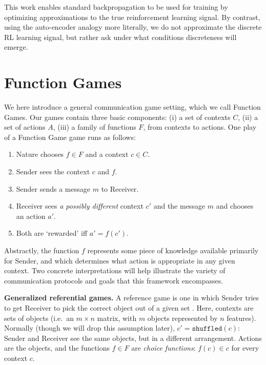 \documentclass[11pt,a4paper]{article}
\newcommand{\nbSST}[1]{{\leavevmode\color{violet}{\scriptsize#1}}}
\begin{document}
This work enables standard backpropagation to be used for training by optimizing approximations to the true reinforcement learning signal.  By contrast, using the auto-encoder analogy more literally, we do not approximate the discrete RL learning signal, but rather ask under what conditions discreteness will emerge. 

\section{Function Games}

We here introduce a general communication game setting, which we call Function Games.  Our games contain three basic components: (i) a set of contexts $C$, (ii) a set of actions $A$, (iii) a family of functions $F$, from contexts to actions.  One play of a Function Game game runs as follows:
\begin{enumerate}[noitemsep]
	\item Nature chooses $f \in F$ and a context $c \in C$.
	\item Sender sees the context $c$ and $f$.
	\item Sender sends a message $m$ to Receiver.
	\item Receiver sees \emph{a possibly different} context $c'$ and the message $m$ and chooses an action $a'$.
	\item Both are `rewarded' iff $a' = f(c')$.
\end{enumerate}
Abstractly, the function $f$ represents some piece of knowledge available primarily for Sender, and which determines what action is appropriate in any given context. Two concrete interpretations will help illustrate the variety of communication protocols and goals that this framework encompasses.

\noindent \textbf{Generalized referential games.}  A reference game is one in which Sender tries to get Receiver to pick the correct object out of a given set \citep{Skyrms2010, Lazaridou2017, Lazaridou2018, Havrylov2017, Chaabouni2019a}.  Here, contexts are sets of objects (i.e.\ an $m \times n$ matrix, with $m$ objects represented by $n$ features).  Normally (though we will drop this assumption later), $c' = \texttt{shuffled}(c)$: Sender and Receiver see the same objects, but in a different arrangement. Actions are the objects, and the functions $f \in F$ are \emph{choice functions}: $f(c) \in c$ for every context $c$.
\end{document}
